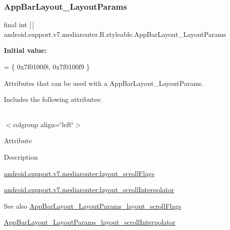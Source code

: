 \subsubsection{\texorpdfstring{App\+Bar\+Layout\+\_\+\+Layout\+Params}{AppBarLayout\_LayoutParams}}
{\footnotesize\ttfamily final int \mbox{[}$\,$\mbox{]} android.\+support.\+v7.\+mediarouter.\+R.\+styleable.\+App\+Bar\+Layout\+\_\+\+Layout\+Params\hspace{0.3cm}{\ttfamily [static]}}

{\bfseries Initial value\+:}
\begin{DoxyCode}
= \{
            0x7f0100f8, 0x7f0100f9
        \}
\end{DoxyCode}
Attributes that can be used with a App\+Bar\+Layout\+\_\+\+Layout\+Params. 

Includes the following attributes\+:

\tabulinesep=1mm
\begin{longtabu} spread 0pt [c]{*{0}{|X[-1]}|}
\hline
\end{longtabu}
$<$colgroup align=\char`\"{}left\char`\"{}$>$ 

Attribute

Description 

{\ttfamily \hyperlink{classandroid_1_1support_1_1v7_1_1mediarouter_1_1R_1_1styleable_a9c61f6843c14b7661616ae4febb6df6e}{android.\+support.\+v7.\+mediarouter\+:layout\+\_\+scroll\+Flags}}

{\ttfamily \hyperlink{classandroid_1_1support_1_1v7_1_1mediarouter_1_1R_1_1styleable_a1c1befc79f0759dda896bed576c263ef}{android.\+support.\+v7.\+mediarouter\+:layout\+\_\+scroll\+Interpolator}}

\begin{DoxySeeAlso}{See also}
\hyperlink{classandroid_1_1support_1_1v7_1_1mediarouter_1_1R_1_1styleable_a9c61f6843c14b7661616ae4febb6df6e}{App\+Bar\+Layout\+\_\+\+Layout\+Params\+\_\+layout\+\_\+scroll\+Flags} 

\hyperlink{classandroid_1_1support_1_1v7_1_1mediarouter_1_1R_1_1styleable_a1c1befc79f0759dda896bed576c263ef}{App\+Bar\+Layout\+\_\+\+Layout\+Params\+\_\+layout\+\_\+scroll\+Interpolator} 
\end{DoxySeeAlso}
\mbox{\label{classandroid_1_1support_1_1v7_1_1mediarouter_1_1R_1_1styleable_a9c61f6843c14b7661616ae4febb6df6e}} 
